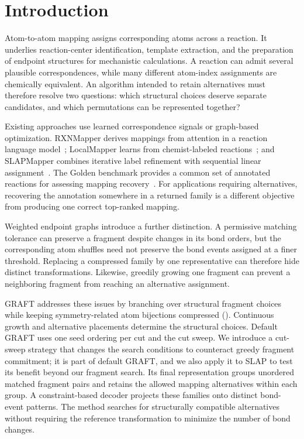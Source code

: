 \section{Introduction}

Atom-to-atom mapping assigns corresponding atoms across a reaction. It underlies reaction-center identification, template extraction, and the preparation of endpoint structures for mechanistic calculations. A reaction can admit several plausible correspondences, while many different atom-index assignments are chemically equivalent. An algorithm intended to retain alternatives must therefore resolve two questions: which structural choices deserve separate candidates, and which permutations can be represented together?

Existing approaches use learned correspondence signals or graph-based optimization. RXNMapper derives mappings from attention in a reaction language model~\citep{schwaller2021}; LocalMapper learns from chemist-labeled reactions~\citep{chen2024}; and SLAPMapper combines iterative label refinement with sequential linear assignment~\citep{koda2025}. The Golden benchmark provides a common set of annotated reactions for assessing mapping recovery~\citep{lin2022}. For applications requiring alternatives, recovering the annotation somewhere in a returned family is a different objective from producing one correct top-ranked mapping.

Weighted endpoint graphs introduce a further distinction. A permissive matching tolerance can preserve a fragment despite changes in its bond orders, but the corresponding atom shuffles need not preserve the bond events assigned at a finer threshold. Replacing a compressed family by one representative can therefore hide distinct transformations. Likewise, greedily growing one fragment can prevent a neighboring fragment from reaching an alternative assignment.

GRAFT addresses these issues by branching over structural fragment choices while keeping symmetry-related atom bijections compressed (). Continuous growth and alternative placements determine the structural choices. Default GRAFT uses one seed ordering per cut and the cut sweep. We introduce a cut-sweep strategy that changes the search conditions to counteract greedy fragment commitment; it is part of default GRAFT, and we also apply it to SLAP to test its benefit beyond our fragment search. Its final representation groups unordered matched fragment pairs and retains the allowed mapping alternatives within each group. A constraint-based decoder projects these families onto distinct bond-event patterns. The method searches for structurally compatible alternatives without requiring the reference transformation to minimize the number of bond changes.

